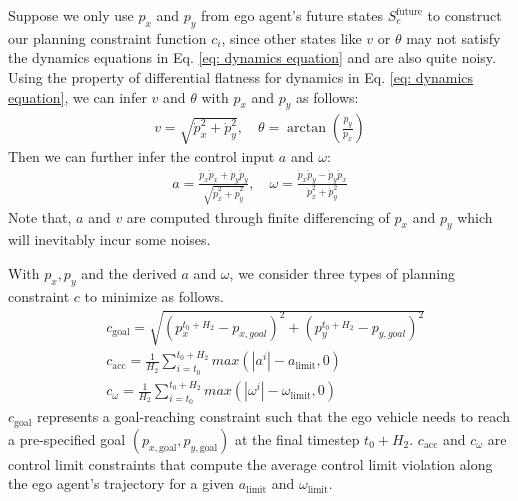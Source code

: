 Suppose we only use $p_x$ and $p_y$ from ego agent's future states $S_e^{\text{future}}$ to construct our planning constraint function $c_i$, since other states like $v$ or $\theta$ may not satisfy the dynamics equations in Eq. \eqref{eq: dynamics equation} and are also quite noisy.
Using the property of differential flatness for dynamics in Eq. \eqref{eq: dynamics equation}, we can infer $v$ and $\theta$ with $p_x$ and $p_y$ as follows:
\begin{align}
    v = \sqrt{\dot p_x^2 + \dot p_y^2}, \quad \theta = \arctan (\frac{\dot p_y}{\dot p_x})
\end{align}
Then we can further infer the control input $a$ and $\omega$:
\begin{align}
    a = \frac{\dot p_x \ddot p_x + \dot p_y \ddot p_y}{\sqrt{\dot p_x^2 + \dot p_y^2}}, \quad \omega = \frac{\dot p_x \ddot p_y - \dot p_y \ddot p_x}{\dot p_x^2 + \dot p_y^2}
\end{align}
Note that, $a$ and $v$ are computed through finite differencing of $p_x$ and $p_y$ which will inevitably incur some noises.


With $p_x, p_y$ and the derived $a$ and $\omega$, we consider three types of planning constraint $c$ to minimize as follows.
\begin{align} \label{eq: 3 planning constraints}
    &c_{\text{goal}} = \sqrt{(p_x^{t_0 + H_2} - p_{x, goal})^2 + (p_y^{t_0 + H_2} - p_{y, goal})^2} \nonumber \\
    &c_{\text{acc}} = \frac{1}{H_2} \sum_{i=t_0}^{t_0 + H_2} max(|a^i| - a_{\text{limit}}, 0) \nonumber \\
    &c_{\omega} = \frac{1}{H_2} \sum_{i=t_0}^{t_0 + H_2} max(|\omega^i| - \omega_{\text{limit}}, 0)
\end{align}
$c_{\text{goal}}$ represents a goal-reaching constraint such that the ego vehicle needs to reach a pre-specified goal $(p_{x, \text{goal}},p_{y, \text{goal}})$ at the final timestep $t_0 + H_2$.
$c_{\text{acc}}$ and $c_{\omega}$ are control limit constraints that compute the average control limit violation along the ego agent's trajectory for a given $a_{\text{limit}}$ and $\omega_{\text{limit}}$.
